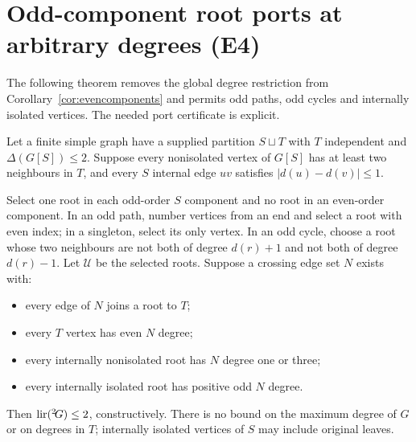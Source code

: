 \section{Odd-component root ports at arbitrary degrees (E4)}\label{sec:rootports}

The following theorem removes the global degree restriction from
Corollary~\ref{cor:evencomponents} and permits odd paths, odd cycles and
internally isolated vertices. The needed port certificate is explicit.

\begin{theorem}\label{thm:rootports}
Let a finite simple graph have a supplied partition $S\sqcup T$ with
$T$ independent and $\Delta(G[S])\le2$. Suppose every nonisolated
vertex of $G[S]$ has at least two neighbours in $T$, and every $S$
internal edge $uv$ satisfies $|d(u)-d(v)|\le1$.

Select one root in each odd-order $S$ component and no root in an
even-order component. In an odd path, number vertices from an end and
select a root with even index; in a singleton, select its only vertex.
In an odd cycle, choose a root whose two neighbours are not both of
degree $d(r)+1$ and not both of degree $d(r)-1$. Let $\mathcal U$ be
the selected roots. Suppose a crossing edge set $N$ exists with:
\begin{itemize}
\item every edge of $N$ joins a root to $T$;
\item every $T$ vertex has even $N$ degree;
\item every internally nonisolated root has $N$ degree one or three;
\item every internally isolated root has positive odd $N$ degree.
\end{itemize}
Then $\operatorname{lir}({}^{2}\!G)\le2$, constructively. There is no bound on the
maximum degree of $G$ or on degrees in $T$; internally isolated
vertices of $S$ may include original leaves.
\end{theorem}
